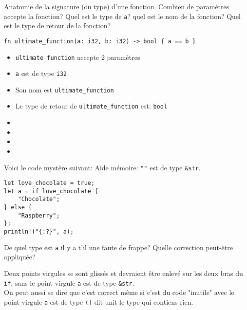 \documentclass[11pt,a4paper,addpoint]{exam}
\begin{document}
\begin{questions}
\question[1] Anatomie de la signature (ou type) d'une fonction.
Combien de paramètres accepte la fonction? Quel est le type de \texttt{a}?
quel est le nom de la fonction? Quel est le type de retour de la fonction?
\begin{verbatim}
fn ultimate_function(a: i32, b: i32) -> bool { a == b }
\end{verbatim}
\ifprintanswers
\begin{solution}
    \begin{itemize}
        \item \texttt{ultimate_function} accepte 2 paramètres
        \item \texttt{a} est de type \texttt{i32}
        \item Son nom est \texttt{ultimate_function}
        \item Le type de retour de \texttt{ultimate_function} est:  \texttt{bool}
    \end{itemize}
\end{solution}
\else
\begin{itemize}
    \item
    \item
    \item
    \item
\end{itemize}
\vspace{0.5in}
\fi

\question[1] Voici le code mystère suivant: Aide mémoire: \texttt{""} est de type
\texttt{&str}.
\begin{verbatim}
let love_chocolate = true;
let a = if love_chocolate {
    "Chocolate";
} else {
    "Raspberry";
};
println!("{:?}", a);
\end{verbatim}
De quel type est \texttt{a} il y a t'il une faute de frappe?
Quelle correction peut-être appliquée?
\ifprintanswers
\begin{solution}
    Deux points virgules se sont glissés et devraient être enlevé sur les deux bras du \texttt{if}, sans le point-virgule \texttt{a} est de type \texttt{&str}.\\ On peut aussi se dire que c'est correct même si c'est du code "inutile" avec le point-virgule \texttt{a} est de type \texttt{()} dit unit le type qui contiens rien.
\end{solution}
\else
\vspace{2in}
\fi


\end{questions}
\end{document}
